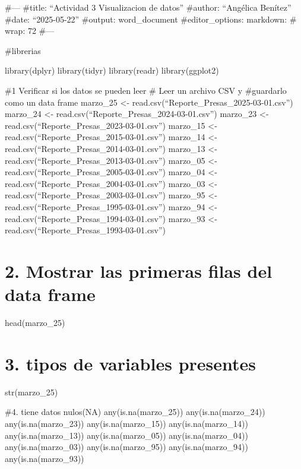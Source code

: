 \documentclass[
]{article}
\author{}
\date{\vspace{-2.5em}}
\begin{document}
\#--- \#title: ``Actividad 3 Visualizacion de datos'' \#author:
``Angélica Benítez'' \#date: ``2025-05-22'' \#output: word\_document
\#editor\_options: markdown: \# wrap: 72 \#---

\#librerias

library(dplyr) library(tidyr) library(readr) library(ggplot2)

\#1 Verificar si los datos se pueden leer \# Leer un archivo CSV y
\#guardarlo como un data frame marzo\_25 \textless-
read.csv(``Reporte\_Presas\_2025-03-01.csv'') marzo\_24 \textless-
read.csv(``Reporte\_Presas\_2024-03-01.csv'') marzo\_23 \textless-
read.csv(``Reporte\_Presas\_2023-03-01.csv'') marzo\_15 \textless-
read.csv(``Reporte\_Presas\_2015-03-01.csv'') marzo\_14 \textless-
read.csv(``Reporte\_Presas\_2014-03-01.csv'') marzo\_13 \textless-
read.csv(``Reporte\_Presas\_2013-03-01.csv'') marzo\_05 \textless-
read.csv(``Reporte\_Presas\_2005-03-01.csv'') marzo\_04 \textless-
read.csv(``Reporte\_Presas\_2004-03-01.csv'') marzo\_03 \textless-
read.csv(``Reporte\_Presas\_2003-03-01.csv'') marzo\_95 \textless-
read.csv(``Reporte\_Presas\_1995-03-01.csv'') marzo\_94 \textless-
read.csv(``Reporte\_Presas\_1994-03-01.csv'') marzo\_93 \textless-
read.csv(``Reporte\_Presas\_1993-03-01.csv'')

\section{2. Mostrar las primeras filas del data
frame}\label{mostrar-las-primeras-filas-del-data-frame}

head(marzo\_25)

\section{3. tipos de variables
presentes}\label{tipos-de-variables-presentes}

str(marzo\_25)

\#4. tiene datos nulos(NA) any(is.na(marzo\_25)) any(is.na(marzo\_24))
any(is.na(marzo\_23)) any(is.na(marzo\_15)) any(is.na(marzo\_14))
any(is.na(marzo\_13)) any(is.na(marzo\_05)) any(is.na(marzo\_04))
any(is.na(marzo\_03)) any(is.na(marzo\_95)) any(is.na(marzo\_94))
any(is.na(marzo\_93))
\end{document}
